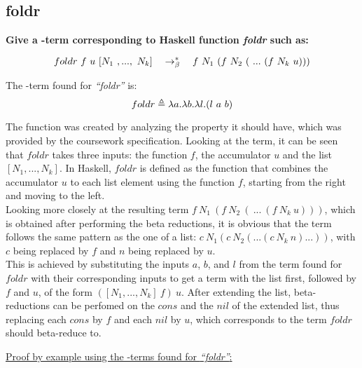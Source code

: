 \documentclass{article}
\begin{document}
	\begin{Large}
	\subsection{foldr}
		\textbf{Give a \lamb -term corresponding to Haskell function \textit{foldr} such as:}
		
		\begin{equation*}
			foldr \ f \ u \ [N_1 \ ,..., \ N_k] \quad \rightarrow_\beta^*\quad f \ N_1\ (f \ N_2 \ ( \ ... \ (f \ N_k \ u)))
		\end{equation*}
		\newline
		
		The \lamb -term found for \textit{``foldr''} is:
		\begin{equation*}
			foldr \triangleq \la a.\la b.\la l.(l \ a \ b)
		\end{equation*}
		\newline
		
		The function was created by analyzing the property it should have, which was provided by the coursework specification. Looking at the term, 
		it can be seen that $foldr$ takes three inputs: the function $f$, the accumulator $u$ and the list $[N_1,...,N_k]$. 
		In Haskell, $foldr$ is defined as the function that combines the accumulator $u$ to each list element using the function $f$, starting from the right and moving to the left.\\
		
		Looking more closely at the resulting term $f \ N_1\ (f \ N_2 \ ( \ ... \ (f \ N_k \ u)))$, which is obtained after performing the beta reductions, 
		it is obvious that the term follows the same pattern as the one of a list: $c \ N_1 (c \ N_2 ( ... ( c \ N_k \ n)...))$,
		with $c$ being replaced by $f$ and $n$ being replaced by $u$. \\
		
		This is achieved by substituting the inputs $a$, $b$, and $l$ from the term found for $foldr$ with their corresponding inputs 
		to get a term with the list first, followed by $f$ and $u$, of the form $ ([N_1,...,N_k] \ f) \ u $. 
		After extending the list, beta-reductions can be perfomed on the $cons$ and the $nil$ of the extended list, 
		thus replacing each $cons$ by $f$ and each $nil$ by $u$, which corresponds to the term $foldr$ should beta-reduce to.\\
		\newpage
		
		\underline{Proof by example using the \lamb -terms found for  \textit{``foldr''}:}\\
		

\end{Large}
\end{document}
